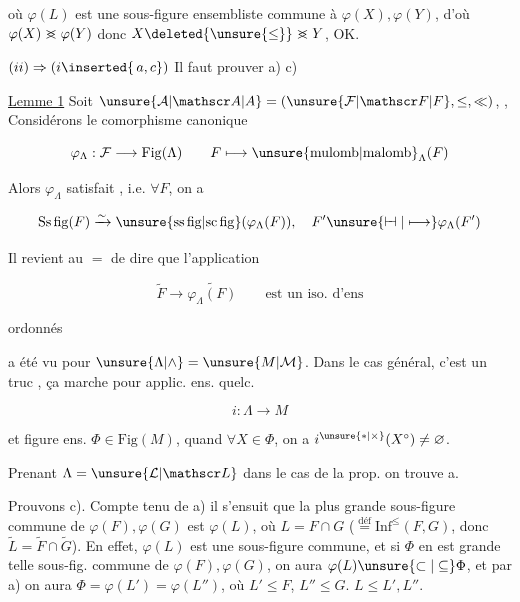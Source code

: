 où $\varphi(L)$ est une sous-figure ensembliste commune à $\varphi(X),\varphi(Y)$, d'où $\varphi(X)\mathrel{>\mkern-13mu<}\varphi(Y)$ donc $X\deleted{\unsure{\leq}}\mathrel{>\mkern-13mu<}Y$, OK.

$(ii)\Rightarrow(i\inserted{\,a,c})$ Il faut prouver a)  c)

\uline{Lemme 1} Soit $\unsure{\mathcal A|\mathscr A|A}=(\unsure{\mathcal F|\mathscr F|F},\leq,\ll)$,  ,  Considérons  le comorphisme canonique

\[
\varphi_{\Lambda}:\mathcal F\longrightarrow\mathrm{Fig}(\Lambda)\qquad F\longmapsto\unsure{\mathrm{mulomb}|\mathrm{malomb}}_{\Lambda}(F)
\]


Alors $\varphi_{\Lambda}$ satisfait , i.e. $\forall F$, on a

\[
\mathrm{Ss\,fig}(F)\xrightarrow{\sim}\unsure{\mathrm{ss\,fig}|\mathrm{sc\,fig}}(\varphi_{\Lambda}(F)),\quad F'\unsure{\mathrel{\vdash\mkern-6mu\dashv}|\longmapsto}\varphi_{\Lambda}(F')
\]

Il revient au $=$ de dire que l'application

\[
\widetilde F\longrightarrow\widetilde{\varphi_{\Lambda}(F)}\qquad \text{est un iso. d'ens}
\]

ordonnés


 a été vu pour $\unsure{\Lambda|\wedge}=\unsure{M|\mathcal M}$. Dans le cas général, c'est un truc , ça marche pour applic. ens. quelc.

\[
i:\Lambda\longrightarrow M
\]

et figure ens. $\Phi\in\mathrm{Fig}(M)$, quand $\forall X\in\Phi$, on a $i^{\unsure{*|\times}}(X^{\circ})\ne\varnothing$.

Prenant $\Lambda=\unsure{\mathcal L|\mathscr L}$ dans  le cas de la prop.  on trouve a.

Prouvons c).   Compte tenu de a) il s'ensuit que la plus grande sous-figure commune de $\varphi(F),\varphi(G)$ est $\varphi(L)$, où $L=F\cap G$  ($\overset{\mathrm{déf}}{=}\mathrm{Inf}^{\leq}(F,G)$, donc $\widetilde L=\widetilde F\cap\widetilde G$). En effet, $\varphi(L)$ est une  sous-figure commune, et si $\Phi$ en est  grande telle sous-fig. commune de $\varphi(F),\varphi(G)$, on aura $\varphi(L)\unsure{\subset|\subseteq}\Phi$,  et par a) on aura $\Phi=\varphi(L')=\varphi(L'')$, où $L'\leq F$, $L''\leq G$.  $L\leq L',L''$.

